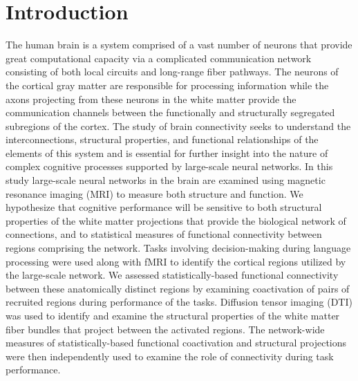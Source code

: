 \documentclass[final,authoryear,5p,times,twocolumn]{elsarticle}
\begin{document}
\section{Introduction}
\label{Intro}
The human brain is a system comprised of a vast number of neurons that provide great computational capacity via a complicated communication network consisting of both local circuits and long-range fiber pathways. The neurons of the cortical gray matter are responsible for processing information while the axons projecting from these neurons in the white matter provide the communication channels between the functionally and structurally segregated subregions of the cortex. The study of brain connectivity seeks to understand the interconnections, structural properties, and functional relationships of the elements of this system and is essential for further insight into the nature of complex cognitive processes supported by large-scale neural networks. In this study large-scale neural networks in the brain are examined using magnetic resonance imaging (MRI) to measure both structure and function. We hypothesize that cognitive performance will be sensitive to both structural properties of the white matter projections that provide the biological network of connections, and to statistical measures of functional connectivity between regions comprising the network. Tasks involving decision-making during language processing were used along with fMRI to identify the cortical regions utilized by the large-scale network. We assessed statistically-based functional connectivity between these anatomically distinct regions by examining coactivation of pairs of recruited regions during performance of the tasks. Diffusion tensor imaging (DTI) was used to identify and examine the structural properties of the white matter fiber bundles that project between the activated regions. The network-wide measures of statistically-based functional coactivation and structural projections were then independently used to examine the role of connectivity during task performance.
\end{document}
